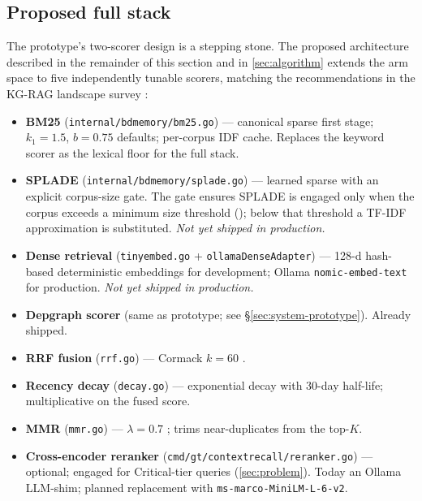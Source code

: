 \subsection{Proposed full stack}
\label{sec:system-proposed}

The prototype's two-scorer design is a stepping stone.  The proposed
architecture described in the remainder of this section and in
\cref{sec:algorithm} extends the arm space to five independently
tunable scorers, matching the recommendations in the KG-RAG landscape
survey \cite{blackrim_ijl0_landscape}:

\begin{itemize}[leftmargin=*]
  \item \textbf{BM25} (\texttt{internal/bdmemory/bm25.go}) --- canonical
        sparse first stage; $k_1 = 1.5$, $b = 0.75$ defaults; per-corpus
        IDF cache.  Replaces the keyword scorer as the lexical floor for
        the full stack.
  \item \textbf{SPLADE} (\texttt{internal/bdmemory/splade.go}) --- learned
        sparse with an explicit corpus-size gate. The gate ensures SPLADE
        is engaged only when the corpus exceeds a minimum size threshold
        (); below that threshold a TF-IDF
        approximation is substituted.  \emph{Not yet shipped in
        production.}
  \item \textbf{Dense retrieval} (\texttt{tinyembed.go} +
        \texttt{ollamaDenseAdapter}) --- 128-d hash-based deterministic
        embeddings for development; Ollama \texttt{nomic-embed-text} for
        production. 
        \emph{Not yet shipped in production.}
  \item \textbf{Depgraph scorer} (same as prototype; see
        \S\ref{sec:system-prototype}).  Already shipped.
  \item \textbf{RRF fusion} (\texttt{rrf.go}) --- Cormack $k = 60$
        \cite{cormack2009reciprocal}.
  \item \textbf{Recency decay} (\texttt{decay.go}) --- exponential decay
        with 30-day half-life; multiplicative on the fused score.
  \item \textbf{MMR} (\texttt{mmr.go}) --- $\lambda = 0.7$
        \cite{carbonell1998mmr}; trims near-duplicates from the top-$K$.
  \item \textbf{Cross-encoder reranker}
        (\texttt{cmd/gt/contextrecall/reranker.go}) --- optional;
        engaged for Critical-tier queries (\cref{sec:problem}).
        Today an Ollama LLM-shim; planned replacement with
        \texttt{ms-marco-MiniLM-L-6-v2}.
\end{itemize}


